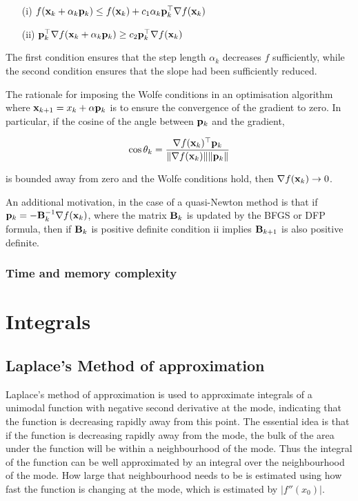 \documentclass{amsart}[12pt]
\begin{document}
\begin{enumerate}
	\item[(i)] $f({\bf x}_k + \alpha_k {\bf p}_k) \leq f({\bf x}_k) + c_1 \alpha_k {\bf p}_k^\top \nabla f({\bf x}_k)$ 
	\item[(ii)] ${\bf p}_k^\top \nabla f({\bf x}_k + \alpha_k {\bf p}_k) \geq c_2 {\bf p}_k^\top \nabla f({\bf x}_k)$ 
\end{enumerate}

The first condition ensures that the step length $\alpha_k$ decreases $f$ sufficiently, while the second condition
ensures that the slope had been sufficiently reduced.

The rationale for imposing the Wolfe conditions in an optimisation algorithm where
${\bf x}_{k+1} = x_k + \alpha {\bf p}_k$ is to ensure the convergence of the gradient to zero. In particular, if the
cosine of the angle between ${\bf p}_k$ and the gradient,

$$
\cos \theta_k = \frac{\nabla f({\bf x}_k)^\top {\bf p}_k}{\|\nabla f({\bf x}_k)\| \|{\bf p}_k\|}
$$

is bounded away from zero and the Wolfe conditions hold, then $\nabla f({\bf x}_k) \to 0$.

An additional motivation, in the case of a quasi-Newton method is that if ${\bf p}_k = - {\bf B}_k^{-1} \nabla f({\bf x}_k)$,
where the matrix ${\bf B}_k$ is updated by the BFGS or DFP formula, then if ${\bf B}_k$ is positive definite condition ii
implies ${\bf B}_{k+1}$ is also positive definite.

\subsubsection{Time and memory complexity}

\section{Integrals}
\subsection{Laplace's Method of approximation}

Laplace's method of approximation is used to approximate integrals of a unimodal function with negative second
derivative at the mode, indicating that the function is decreasing rapidly away from this point. The essential
idea is that if the function is decreasing rapidly away from the mode, the bulk of the area under the function
will be within a neighbourhood of the mode. Thus the integral of the function can be well approximated by an
integral over the neighbourhood of the mode. How large that neighbourhood needs to be is estimated using
how fast the function is changing at the mode, which is estimated by $|f''(x_0)|$.
\end{document}
